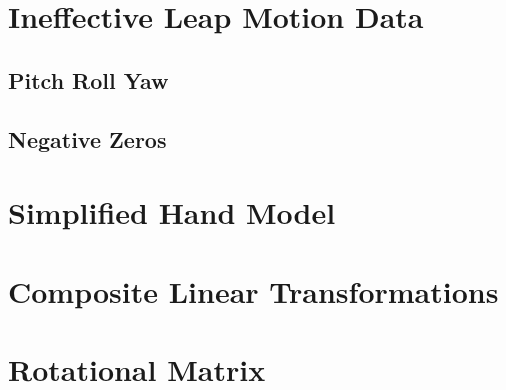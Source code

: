 \section{Ineffective Leap Motion Data}


\subsection{Pitch Roll Yaw}


\subsection{Negative Zeros}





\section{Simplified Hand Model}
	
	

\section{Composite Linear Transformations}






\section{Rotational Matrix}





